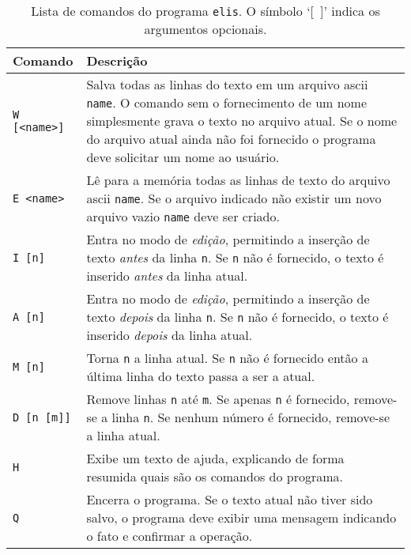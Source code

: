 \documentclass[11pt,a4paper]{article}
\begin{document}
\begin{table}[htb!]
\begin{center}
\footnotesize
\begin{tabular}{p{1.9cm}  p{12cm}} \toprule
\textbf{\sc Comando}                       & \textbf{\sc Descrição} \\ \midrule
\rule[-2mm]{0mm}{6mm}\texttt{W [<name>]}   & Salva todas as linhas do texto em um arquivo ascii \texttt{name}.
                                             O comando sem o fornecimento de um nome simplesmente grava o texto no arquivo atual.
                                             Se o nome do arquivo atual ainda não foi fornecido o programa deve solicitar um nome ao usuário.\\
\rule[-2mm]{0mm}{6mm}\texttt{E <name>}     & Lê para a memória todas as linhas de texto do arquivo ascii \texttt{name}.
                                             Se o arquivo indicado não existir um novo arquivo vazio \texttt{name} deve ser criado.\\
\rule[-2mm]{0mm}{6mm}\texttt{I [n]}        & Entra no modo de \textsl{edição}, permitindo a inserção de texto \emph{antes} da linha \texttt{n}.
                                             Se \texttt{n} não é fornecido, o texto é inserido \emph{antes} da linha atual.\\
\rule[-2mm]{0mm}{6mm}\texttt{A [n]}        & Entra no modo de \textsl{edição}, permitindo a inserção de texto \emph{depois} da linha \texttt{n}.
                                             Se \texttt{n} não é fornecido, o texto é inserido \emph{depois} da linha atual.\\
\rule[-2mm]{0mm}{6mm}\texttt{M [n]}        & Torna \texttt{n} a linha atual.
                                             Se \texttt{n} não é fornecido então a última linha do texto passa a ser a atual.\\
\rule[-2mm]{0mm}{6mm}\texttt{D [n [m]]}    & Remove linhas \texttt{n} até \texttt{m}.
                                             Se apenas \texttt{n} é fornecido, remove-se a linha \texttt{n}.
                                             Se nenhum número é fornecido, remove-se a linha atual.\\
\rule[-2mm]{0mm}{6mm}\texttt{H}            & Exibe um texto de ajuda, explicando de forma resumida quais são os comandos do programa.\\
\rule[-2mm]{0mm}{6mm}\texttt{Q}            & Encerra o programa. Se o texto atual não tiver sido salvo, o programa deve exibir uma mensagem indicando o fato e confirmar a operação.\\

\bottomrule
\end{tabular}
\end{center}
\normalsize
\caption{Lista de comandos do programa \texttt{elis}. O símbolo `[{\ }]' indica os argumentos opcionais.}

\label{tab:cmds}
\end{table}
\end{document}

